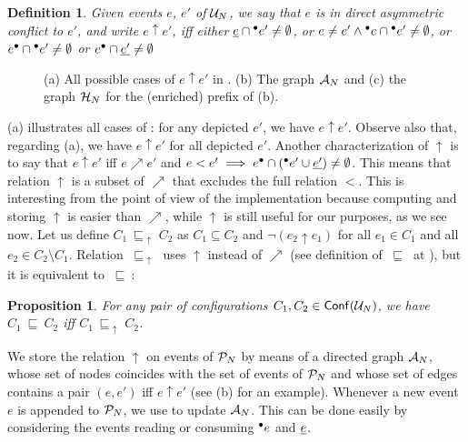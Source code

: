 \documentclass[11pt,a4paper]{article}
\newtheorem{definition}[theorem]{Definition}
\newtheorem{proposition}[theorem]{Proposition}
\newcommand{\conf}[1]{\ensuremath{\mathsf{Conf}(#1)}}
\newcommand{\evolves}{{\ensuremath{\ \sqsubseteq \ }}}
\newcommand{\devolves}{\evolves_{\!\!\!\uparrow}\;}
\begin{document}
\begin{definition}
\label{def:direct.asymmetric}
Given events $e$, $e'$ of $\mathcal{U}_{N}$, we say that $e$ is in \emph{direct
asymmetric conflict} to $e'$, and write $e \uparrow e'$, iff either
$\underline{e} \cap {}^\bullet e' \ne \emptyset$, or
$e \ne e' \land {}^\bullet e \cap {}^\bullet e' \ne \emptyset$, or
$e^\bullet \cap {}^\bullet e' \ne \emptyset$ or
$e^\bullet \cap \underline{e'} \ne \emptyset$
\end{definition}

\begin{figure}
\caption{(a) All possible cases of $e \uparrow e'$ in .
(b) The graph $\mathcal{A}_{N}$ and (c) the graph $\mathcal{H}_{N}$ for the (enriched) prefix of
 (b).}
\label{fig:the.graph}
\end{figure}

 (a) illustrates all cases of : for any
depicted $e'$, we have $e \uparrow e'$.  Observe also that, regarding
 (a), we have $e \uparrow e'$ for all depicted $e'$.
Another characterization of $\uparrow$ is to say that $e \uparrow e'$ iff $e
\nearrow e'$ and $e < e' \implies e^\bullet \cap ({}^\bullet e' \cup \underline{e'}) \ne
\emptyset$.  This means that relation $\uparrow$ is a subset of $\nearrow$ that
excludes the full relation $<$.  This is interesting from the point of view of
the implementation because computing and storing $\uparrow$ is easier than
$\nearrow$, while $\uparrow$ is still useful for our purposes, as we see now.
Let us define $C_1 \devolves C_2$ as $C_1 \subseteq C_2$ and $\lnot (e_2
\uparrow e_1)$ for all $e_1 \in C_1$ and all $e_2 \in C_2 \setminus C_1$.
Relation $\devolves$ uses $\uparrow$ instead of $\nearrow$ (see definition of
$\evolves$ at ), but it is equivalent to $\evolves$:

\begin{proposition}
For any pair of configurations $C_1, C_2 \in \conf{\unf N}$, we have $C_1
\evolves C_2$ iff $C_1 \devolves C_2$.
\end{proposition}

We store the relation $\uparrow$ on events of $\mathcal{P}_{N}$ by means of a directed
graph $\mathcal{A}_{N}$, whose set of nodes coincides with the set of events of $\mathcal{P}_{N}$ and whose set of edges contains a pair $(e, e')$ iff $e \uparrow e'$ (see
 (b) for an example).  Whenever a new event $e$ is appended to
$\mathcal{P}_{N}$, we use  to update $\mathcal{A}_{N}$.  This can be
done easily by considering the events reading or consuming ${}^\bullet e$ and $\underline{e}$.  
\end{document}
